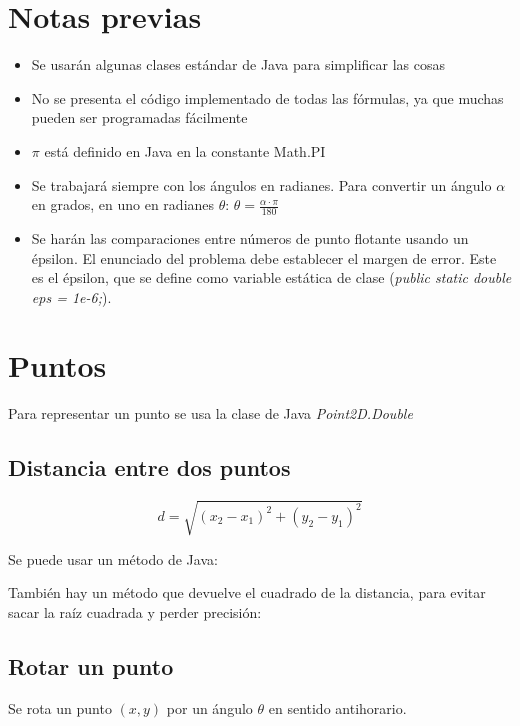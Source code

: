 \documentclass{article}
\begin{document}
\begin{multicols}{2}

\section{Notas previas}
\begin{itemize}
	\item Se usarán algunas clases estándar de Java para simplificar las cosas
	\item No se presenta el código implementado de todas las fórmulas, ya que muchas pueden ser programadas fácilmente
	\item \( \pi \) está definido en Java en la constante Math.PI
	\item Se trabajará siempre con los ángulos en radianes. Para convertir un ángulo \( \alpha \) en grados, en uno en radianes \( \theta \): \( \theta = \frac{\alpha \cdot \pi}{180} \)
	\item Se harán las comparaciones entre números de punto flotante usando un épsilon. El enunciado del problema debe establecer el margen de error. Este es el épsilon, que se define como variable estática de clase (\emph{public static double eps = 1e-6;}).
\end{itemize}


\section{Puntos}
Para representar un punto se usa la clase de Java \emph{Point2D.Double}


\subsection{Distancia entre dos puntos}
\[ d = \sqrt{(x_2-x_1)^{2} + (y_2-y_1)^{2}} \]

Se puede usar un método de Java:


También hay un método que devuelve el cuadrado de la distancia, para evitar sacar la raíz cuadrada y perder precisión:


\subsection{Rotar un punto}
Se rota un punto \( (x, y) \) por un ángulo \( \theta \) en sentido antihorario.



\end{multicols}
\end{document}
